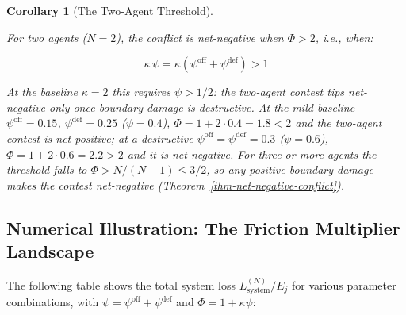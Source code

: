 \documentclass[11pt]{article}
\theoremstyle{plain}
\newtheorem{corollary}[theorem]{Corollary}
\theoremstyle{definition}
\theoremstyle{remark}
\let\origsubsection\subsection
\renewcommand{\subsection}{\needspace{7\baselineskip}\origsubsection}
\begin{document}
\begin{corollary}[The Two-Agent Threshold]
\label{cor-two-agent-threshold}

For two agents ($N = 2$), the conflict is net-negative when $\Phi > 2$, i.e., when:

$$\kappa \, \psi = \kappa(\psi^{\text{off}} + \psi^{\text{def}}) > 1$$

At the baseline $\kappa = 2$ this requires $\psi > 1/2$: the two-agent contest tips net-negative only once boundary damage is \emph{destructive}. At the mild baseline $\psi^{\text{off}} = 0.15$, $\psi^{\text{def}} = 0.25$ ($\psi = 0.4$), $\Phi = 1 + 2 \cdot 0.4 = 1.8 < 2$ and the two-agent contest is net-positive; at a destructive $\psi^{\text{off}} = \psi^{\text{def}} = 0.3$ ($\psi = 0.6$), $\Phi = 1 + 2 \cdot 0.6 = 2.2 > 2$ and it is net-negative. For three or more agents the threshold falls to $\Phi > N/(N-1) \leq 3/2$, so any positive boundary damage makes the contest net-negative (Theorem~\ref{thm-net-negative-conflict}).
\end{corollary}

\subsection{Numerical Illustration: The Friction Multiplier
Landscape}\label{numerical-illustration-the-friction-multiplier-landscape}

The following table shows the total system loss
\(L_{\text{system}}^{(N)} / E_j\) for various parameter combinations,
with \(\psi = \psi^{\text{off}} + \psi^{\text{def}}\) and
\(\Phi = 1 + \kappa\psi\):
\end{document}

